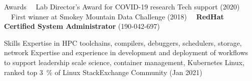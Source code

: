 \documentclass[11pt]{resume}
\begin{document}
\begin{category}{Awards}
\citembullet~~Lab Director's Award for COVID-19 research Tech support (2020)
\citembullet~~First winner at Smokey Mountain Data Challenge (2018)
\citembullet~~\textbf{RedHat Certified System Administrator} (190-042-697)
\end{category}

\begin{category}{Skills}
\citembullet Expertise in HPC toolchains, compilers, debuggers, schedulers, storage, network
\citembullet Expertise and experience in development and deployment of workflows to support leadership scale science, container management, Kubernetes
\citembullet Linux, ranked top 3~\% of Linux StackExchange Community (Jan 2021)
\end{category}


\renewcommand\refname{Relevant Publications \& Presentations}

\nocite{*}
% 
\end{document}

